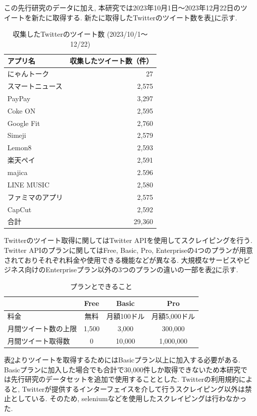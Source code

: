 \noindent
この先行研究のデータに加え, 本研究では2023年10月1日〜2023年12月22日のツイートを新たに取得する. 新たに取得したTwitterのツイート数を表\ref{tb:rawtweetnum2023}に示す. 

\begin{table}[H]
  \caption{収集したTwitterのツイート数 (2023/10/1〜12/22) }
  \label{tb:rawtweetnum2023}
  \begin{center}
  \begin{tabular}{l|r}
    \hline
    アプリ名&収集したツイート数（件）\\\hline\hline
    にゃんトーク&27\\\hline
    スマートニュース&2,575\\\hline
    PayPay&3,297\\\hline
    Coke ON&2,595\\\hline
    Google Fit&2,760\\\hline
    Simeji&2,579\\\hline
    Lemon8&2,593\\\hline
    楽天ペイ&2,591\\\hline
    majica&2.596\\\hline
    LINE MUSIC&2,580\\\hline
    ファミマのアプリ&2,575\\\hline
    CapCut&2,592\\\hline\hline
    合計&29,360
  \end{tabular}\end{center}
\end{table}

Twitterのツイート取得に関してはTwitter APIを使用してスクレイピングを行う. Twitter APIのプランに関してはFree, Basic, Pro, Enterpriseの4つのプランが用意されておりそれぞれ料金や使用できる機能などが異なる. 大規模なサービスやビジネス向けのEnterpriseプラン以外の3つのプランの違いの一部を表\ref{tb:xplan}に示す. 

\begin{table}[H]
  \caption{プランとできること}
  \label{tb:xplan}
  \begin{center}
  \begin{tabular}{l|c|c|c}
    \hline
    &Free&Basic&Pro \\\hline\hline
    料金&無料&月額100ドル&月額5,000ドル \\\hline
    月間ツイート数の上限&1,500&3,000&300,000 \\\hline
    月間ツイート取得数&0&10,000&1,000,000 \\\hline
  \end{tabular}\end{center}
\end{table}
表\ref{tb:xplan}よりツイートを取得するためにはBasicプラン以上に加入する必要がある. Basicプランに加入した場合でも合計で30,000件しか取得できないため本研究では先行研究のデータセットを追加で使用することとした. Twitterの利用規約によると, Twitterが提供するインターフェイスを介して行うスクレイピング以外は禁止としている. そのため, seleniumなどを使用したスクレイピングは行わなかった.  

